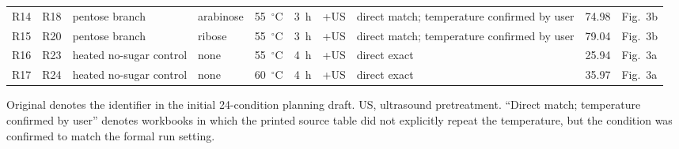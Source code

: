 \begin{table}[p]
\begin{tabular}{@{}llllllllcl@{}}
R14 & R18 & pentose branch & arabinose & 55~$^\circ$C & 3~h & +US & direct match; temperature confirmed by user & 74.98 & Fig.~3b \\
R15 & R20 & pentose branch & ribose & 55~$^\circ$C & 3~h & +US & direct match; temperature confirmed by user & 79.04 & Fig.~3b \\
R16 & R23 & heated no-sugar control & none & 55~$^\circ$C & 4~h & +US & direct exact & 25.94 & Fig.~3a \\
R17 & R24 & heated no-sugar control & none & 60~$^\circ$C & 4~h & +US & direct exact & 35.97 & Fig.~3a \\
\bottomrule
\end{tabular}
\begin{flushleft}
\scriptsize Original denotes the identifier in the initial 24-condition planning draft. US, ultrasound pretreatment. ``Direct match; temperature confirmed by user'' denotes workbooks in which the printed source table did not explicitly repeat the temperature, but the condition was confirmed to match the formal run setting.
\end{flushleft}
\end{table}